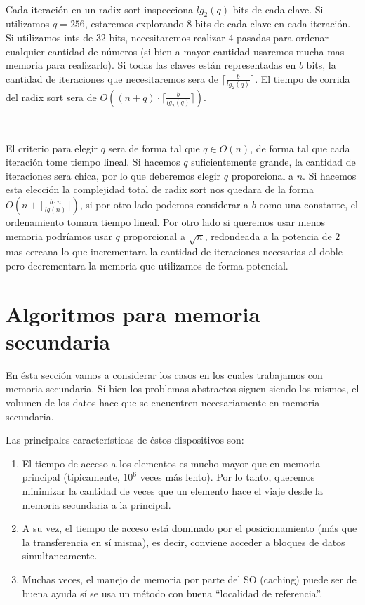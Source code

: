 ~

Cada iteraci\'on en un radix sort inspecciona $lg_2(q)$ bits de cada clave. Si utilizamos $q=256$, estaremos explorando $8$ bits de cada clave en cada iteraci\'on. Si utilizamos ints de $32$ bits, necesitaremos realizar $4$ pasadas para ordenar cualquier cantidad de n\'umeros (si bien a mayor cantidad usaremos mucha mas memoria para realizarlo). Si todas las claves est\'an representadas en $b$ bits, la cantidad de iteraciones que necesitaremos sera de $\lceil \frac{b}{lg_2(q)} \rceil$. El tiempo de corrida del radix sort sera de $O((n+q) \cdot \lceil \frac{b}{lg_2(q)} \rceil)$.

~

El criterio para elegir $q$ sera de forma tal que $q \in O(n)$, de forma tal que cada iteraci\'on tome tiempo lineal. Si hacemos $q$ suficientemente grande, la cantidad de iteraciones sera chica, por lo que deberemos elegir $q$ proporcional a $n$. Si hacemos esta elecci\'on la complejidad total de radix sort nos quedara de la forma $O(n + \lceil \frac{b \cdot n}{lg(n)} \rceil)$, si por otro lado podemos considerar a $b$ como una constante, el ordenamiento tomara tiempo lineal. Por otro lado si queremos usar menos memoria podr\'iamos usar $q$ proporcional a $\sqrt{n}$, redondeada a la potencia de $2$ mas cercana lo que incrementara la cantidad de iteraciones necesarias al doble pero decrementara la memoria que utilizamos de forma potencial.

\newpage
\section{Algoritmos para memoria secundaria}

En \'esta secci\'on vamos a considerar los casos en los cuales trabajamos con memoria secundaria. S\'i bien los problemas abstractos siguen siendo los mismos, el volumen de los datos hace que se encuentren necesariamente en memoria secundaria. 

Las principales caracter\'isticas de \'estos dispositivos son:
 \begin{enumerate}
  \item El tiempo de acceso a los elementos es mucho mayor que en memoria principal (t\'ipicamente, $10^6$ veces m\'as lento). Por lo tanto, queremos minimizar la cantidad de veces que un elemento hace el viaje desde la memoria secundaria a la principal.
  \item A su vez, el tiempo de acceso est\'a dominado por el posicionamiento (m\'as que la transferencia en s\'i misma), es decir, conviene acceder a bloques de datos simultaneamente. 
  \item Muchas veces, el manejo de memoria por parte del SO (caching) puede ser de buena ayuda s\'i se usa un m\'etodo con buena ``localidad de referencia''.
 \end{enumerate}

